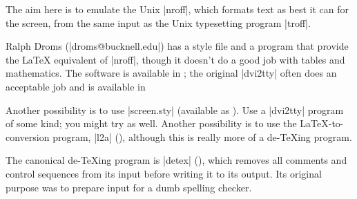 
The aim here is to emulate the Unix \ProgName|nroff|, which formats
text as best it can for the screen, from the same
input as the Unix typesetting program \ProgName|troff|.

Ralph Droms (\Email|droms@bucknell.edu|) has a style file and a
program that provide the \LaTeX{} equivalent of \ProgName|nroff|,
though it doesn't do a good job with tables and mathematics. The
software is available in ; the original
\ProgName|dvi2tty| often does an acceptable job and is available in

Another possibility is to use \File|screen.sty| (available as
). Use a \ProgName|dvi2tty| program of some kind;
you might try  as well.  Another possibility is to
use the \LaTeX{}-to- conversion program, \ProgName|l2a|
(), although this is really more of a de-\TeX{}ing
program.

The canonical de-\TeX{}ing program is \ProgName|detex|
(), which removes all comments and control sequences
from its input before writing it to its output.  Its original purpose
was to prepare input for a dumb spelling checker.


